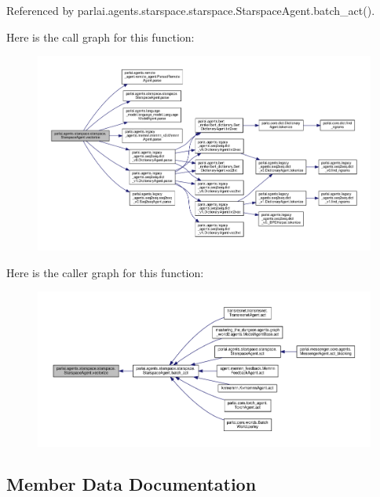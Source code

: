 Referenced by parlai.\+agents.\+starspace.\+starspace.\+Starspace\+Agent.\+batch\+\_\+act().

Here is the call graph for this function\+:
\nopagebreak
\begin{figure}[H]
\begin{center}
\leavevmode
\includegraphics[width=350pt]{classparlai_1_1agents_1_1starspace_1_1starspace_1_1StarspaceAgent_a87253cca09c8b22848ff0bea7195e32d_cgraph}
\end{center}
\end{figure}
Here is the caller graph for this function\+:
\nopagebreak
\begin{figure}[H]
\begin{center}
\leavevmode
\includegraphics[width=350pt]{classparlai_1_1agents_1_1starspace_1_1starspace_1_1StarspaceAgent_a87253cca09c8b22848ff0bea7195e32d_icgraph}
\end{center}
\end{figure}


\subsection{Member Data Documentation}
\mbox{\label{classparlai_1_1agents_1_1starspace_1_1starspace_1_1StarspaceAgent_a1986fb638717b81936ada2bf418b259f}} 
